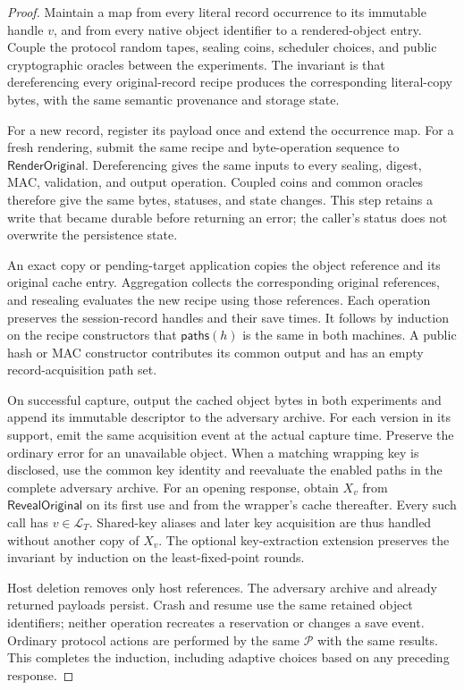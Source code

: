 \begin{proof}
Maintain a map from every literal record occurrence to its immutable handle
$v$, and from every native object identifier to a rendered-object entry.
Couple the protocol random tapes, sealing coins, scheduler choices, and public
cryptographic oracles between the experiments.  The invariant is that
dereferencing every original-record recipe produces the corresponding
literal-copy bytes, with the same semantic provenance and storage state.

For a new record, register its payload once and extend the occurrence map.
For a fresh rendering, submit the same recipe and byte-operation sequence to
$\mathsf{RenderOriginal}$.  Dereferencing gives the same inputs to every
sealing, digest, MAC, validation, and output operation.  Coupled coins and
common oracles therefore give the same bytes, statuses, and state changes.
This step retains a write that became durable before returning an error;
the caller's status does not overwrite the persistence state.

An exact copy or pending-target application copies the object reference and
its original cache entry.  Aggregation collects the corresponding original
references, and resealing evaluates the new recipe using those references.
Each operation preserves the session-record handles and their save times.
It follows by induction on the recipe constructors that
$\mathsf{paths}(h)$ is the same in both machines.  A public hash or MAC
constructor contributes its common output and has an empty record-acquisition
path set.

On successful capture, output the cached object bytes in both experiments
and append its immutable descriptor to the adversary archive.  For each
version in its support, emit the same acquisition event at the actual
capture time.  Preserve the ordinary error for an unavailable object.
When a matching wrapping key is disclosed, use the common key identity and
reevaluate the enabled paths in the complete adversary archive.  For an
opening response, obtain $X_v$ from $\mathsf{RevealOriginal}$ on its first
use and from the wrapper's cache thereafter.  Every such call has
$v\in\mathcal L_T$.  Shared-key aliases and later key acquisition are thus
handled without another copy of $X_v$.  The optional key-extraction extension
preserves the invariant by induction on the least-fixed-point rounds.

Host deletion removes only host references.  The adversary archive and
already returned payloads persist.  Crash and resume use the same retained
object identifiers; neither operation recreates a reservation or changes a
save event.  Ordinary protocol actions are performed by the same
$\mathcal P$ with the same results.  This completes the induction, including
adaptive choices based on any preceding response.


\end{proof}

